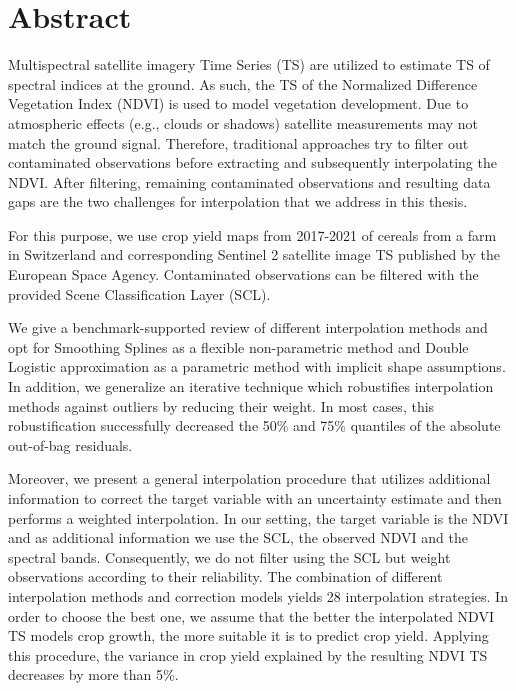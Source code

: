 \chapter*{Abstract}

Multispectral satellite imagery Time Series (TS) are utilized to estimate TS of spectral indices at the ground. As such, the TS of the Normalized Difference Vegetation Index (NDVI) is used to model vegetation development. 
Due to atmospheric effects (e.g., clouds or shadows) satellite measurements may not match the ground signal. Therefore, traditional approaches try to filter out contaminated observations before extracting and subsequently interpolating the NDVI. After filtering, remaining contaminated observations and resulting data gaps are the two challenges for interpolation that we address in this thesis.

For this purpose, we use crop yield maps from 2017-2021 of cereals from a farm in Switzerland and corresponding Sentinel 2 satellite image TS published by the European Space Agency. Contaminated observations can be filtered with the provided Scene Classification Layer (SCL). 

We give a benchmark-supported review of different interpolation methods and opt for Smoothing Splines as a flexible non-parametric method and Double Logistic approximation as a parametric method with implicit shape assumptions. In addition, we generalize an iterative technique which robustifies interpolation methods against outliers by reducing their weight. In most cases, this robustification successfully decreased the 50\% and 75\% quantiles of the absolute out-of-bag residuals. 

Moreover, we present a general interpolation procedure that utilizes additional information to correct the target variable with an uncertainty estimate and then performs a weighted interpolation. In our setting, the target variable is the NDVI and as additional information we use the SCL, the observed NDVI and the spectral bands. Consequently, we do not filter using the SCL but weight observations according to their reliability. The combination of different interpolation methods and correction models yields 28 interpolation strategies. In order to choose the best one, we assume that the better the interpolated NDVI TS models crop growth, the more suitable it is to predict crop yield. 
Applying this procedure, the variance in crop yield explained by the resulting NDVI TS decreases by more than 5\%. 

